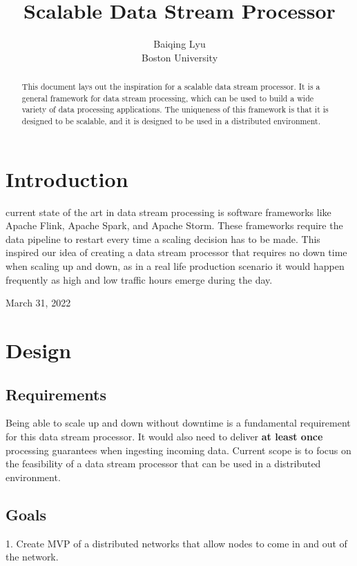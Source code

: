 \documentclass[journal]{IEEEtran}
\begin{document}
\title{Scalable Data Stream Processor}
\author{Baiqing Lyu \\Boston University}
\maketitle

\begin{abstract}
This document lays out the inspiration for a scalable data stream processor.
It is a general framework for data stream processing, which can be used to
build a wide variety of data processing applications. The uniqueness of this
framework is that it is designed to be scalable, and it is designed to be used
in a distributed environment.
\end{abstract}

\section{Introduction}

 current state of the art in data stream processing is software 
frameworks like Apache Flink, Apache Spark, and Apache Storm. These frameworks require
the data pipeline to restart every time a scaling decision has to be made. This inspired
our idea of creating a data stream processor that requires no down time when scaling up
and down, as in a real life production scenario it would happen frequently as high 
and low traffic hours emerge during the day.

\hfill March 31, 2022

\section{Design}

\subsection{Requirements}
Being able to scale up and down without downtime is a fundamental requirement for 
this data stream processor. It would also need to deliver \textbf{at least once} 
processing guarantees when ingesting incoming data. Current scope is to focus on the
feasibility of a data stream processor that can be used in a distributed environment.
\subsection{Goals}
1. Create MVP of a distributed networks that allow nodes to come in and out of the 
network.
\end{document}
